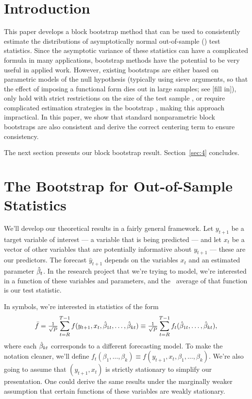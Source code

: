 \documentclass[12pt,fleqn]{article}
\begin{document}
\section{Introduction}

This paper develops a block bootstrap method that can be used to
consistently estimate the distributions of asymptotically normal
out-of-sample (\oos) test statistics. Since the asymptotic variance of
these statistics can have a complicated formula in many applications,
bootstrap methods have the potential to be very useful in applied
work. However, existing bootstraps are either based on parametric
models of the null hypothesis (typically using sieve arguments, so
that the effect of imposing a functional form dies out in large
samples; see [fill in]), only hold with strict restrictions on the
size of the test sample \citep{Whi:00,Han:05}, or require complicated
estimation strategies in the bootstrap \citep{CoS:07}, making this
approach impractical. In this paper, we show that standard
nonparametric block bootstraps are also consistent and derive the
correct centering term to ensure consistency.

The next section presents our block bootstrap result.
Section~\ref{sec:4} concludes.

\section{The Bootstrap for Out-of-Sample Statistics}

We'll develop our theoretical results in a fairly general
framework. Let $y_{t+1}$ be a target variable of interest --- a
variable that is being predicted --- and let $x_t$ be a vector of
other variables that are potentially informative about $y_{t+1}$ ---
these are our predictors. The forecast $\hat y_{t+1}$ depends on the
variables $x_t$ and an estimated parameter $\hat \beta_t$. In the research
project that we're trying to model, we're interested in a function of
these variables and parameters, and the \oos\ average of that function
is our test statistic.

In symbols, we're interested in statistics of the form
\begin{equation*}
  \bar f = \tfrac{1}{\sqrt{P}} \sum_{t=R}^{T-1} f(y_{t+1}, x_t, \hat \beta_{1t},\dots,\hat \beta_{kt})
  \equiv \tfrac{1}{\sqrt{P}} \sum_{t=R}^{T-1} f_t(\hat \beta_{1t},\dots,\hat \beta_{kt}),
\end{equation*}
where each $\hat \beta_{kt}$ corresponds to a different forecasting model.
To make the notation cleaner, we'll define $f_t(\beta_1,\dots,\beta_k)
\equiv f(y_{t+1}, x_t, \beta_1,\dots,\beta_k)$. We're also going to
assume that $(y_{t+1}, x_t)$ is strictly stationary to simplify our
presentation. One could derive the same results under the marginally
weaker assumption that certain functions of these variables are weakly
stationary.
\end{document}
